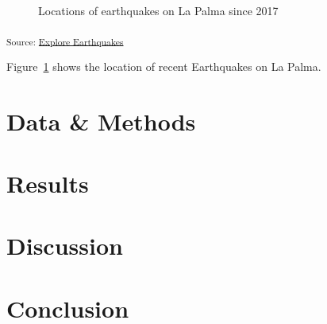 \documentclass[
]{agujournal2019}
\begin{document}
\begin{figure}[H]


\caption{\label{fig-spatial-plot}Locations of earthquakes on La Palma
since 2017}

\end{figure}%

\textsubscript{Source:
\href{https://tiernanmartin.github.io/2024-transit-oriented-development-bill/notebooks/explore-earthquakes-preview.html\#cell-fig-spatial-plot}{Explore
Earthquakes}}

Figure~\ref{fig-spatial-plot} shows the location of recent Earthquakes
on La Palma.

\section{Data \& Methods}\label{sec-data-methods}

\section{Results}\label{results}

\section{Discussion}\label{discussion}

\section{Conclusion}\label{conclusion}
\end{document}
